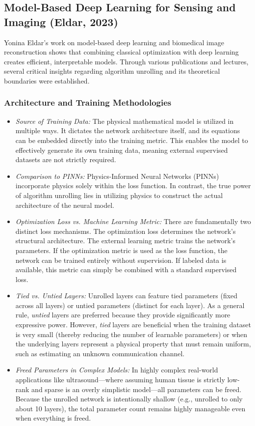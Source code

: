 \documentclass[conference]{IEEEtran}
\begin{document}
\subsection{Model-Based Deep Learning for Sensing and Imaging (Eldar, 2023) \texorpdfstring{\cite{shlezinger2023model}}{}}

Yonina Eldar's work on model-based deep learning and biomedical image reconstruction shows that combining classical optimization with deep learning creates efficient, interpretable models. Through various publications and lectures, several critical insights regarding algorithm unrolling and its theoretical boundaries were established.

\subsubsection{Architecture and Training Methodologies}
\begin{itemize}
    \item \textit{Source of Training Data:} The physical mathematical model is utilized in multiple ways. It dictates the network architecture itself, and its equations can be embedded directly into the training metric. This enables the model to effectively generate its own training data, meaning external supervised datasets are not strictly required.
    \item \textit{Comparison to PINNs:} Physics-Informed Neural Networks (PINNs) incorporate physics solely within the loss function. In contrast, the true power of algorithm unrolling lies in utilizing physics to construct the actual architecture of the neural model.
    \item \textit{Optimization Loss vs. Machine Learning Metric:} There are fundamentally two distinct loss mechanisms. The optimization loss determines the network's structural architecture. The external learning metric trains the network's parameters. If the optimization metric is used as the loss function, the network can be trained entirely without supervision. If labeled data is available, this metric can simply be combined with a standard supervised loss.
    \item \textit{Tied vs. Untied Layers:} Unrolled layers can feature tied parameters (fixed across all layers) or untied parameters (distinct for each layer). As a general rule, \textit{untied} layers are preferred because they provide significantly more expressive power. However, \textit{tied} layers are beneficial when the training dataset is very small (thereby reducing the number of learnable parameters) or when the underlying layers represent a physical property that must remain uniform, such as estimating an unknown communication channel.
    \item \textit{Freed Parameters in Complex Models:} In highly complex real-world applications like ultrasound—where assuming human tissue is strictly low-rank and sparse is an overly simplistic model—all parameters can be freed. Because the unrolled network is intentionally shallow (e.g., unrolled to only about 10 layers), the total parameter count remains highly manageable even when everything is freed.
\end{itemize}
\end{document}
